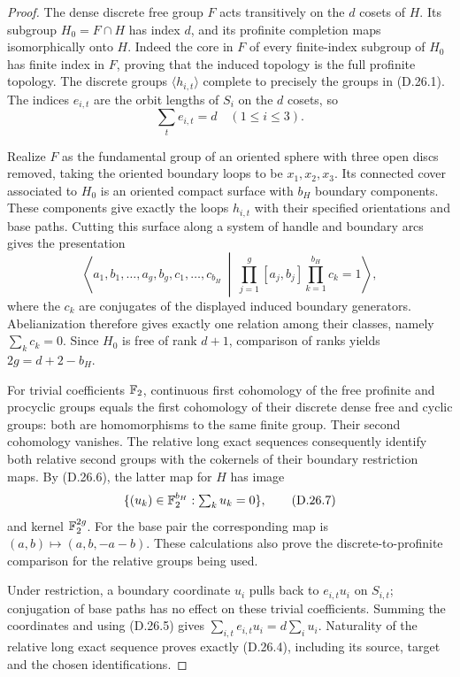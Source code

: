 \begin{proof}
The dense discrete free group $F$ acts transitively on the
$d$ cosets of $H$.  Its subgroup $H_0=F\cap H$ has index $d$,
and its profinite completion maps isomorphically onto $H$.
Indeed the core in $F$ of every finite-index subgroup of $H_0$
has finite index in $F$, proving that the induced topology is the
full profinite topology.  The discrete groups
$\langle h_{i,t}\rangle$ complete to precisely the groups in
\textup{(D.26.1)}.  The indices $e_{i,t}$ are the orbit lengths
of $S_i$ on the $d$ cosets, so
\[
                  \sum_t e_{i,t}=d\quad(1\leq i\leq3).
 \tag{D.26.5}
\]

Realize $F$ as the fundamental group of an oriented sphere
with three open discs removed, taking the oriented boundary
loops to be $x_1,x_2,x_3$.  Its connected cover associated to
$H_0$ is an oriented compact surface with $b_H$ boundary
components.  These components give exactly the loops
$h_{i,t}$ with their specified orientations and base paths.
Cutting this surface along a system of handle and boundary
arcs gives the presentation
\[
 \left\langle a_1,b_1,\ldots,a_g,b_g,
      c_1,\ldots,c_{b_H}\ \middle|\
      \prod_{j=1}^{g}[a_j,b_j]\prod_{k=1}^{b_H}c_k=1
 \right\rangle,
 \tag{D.26.6}
\]
where the $c_k$ are conjugates of the displayed induced boundary
generators.  Abelianization therefore gives exactly one relation
among their classes, namely $\sum_k c_k=0$.  Since
$H_0$ is free of rank $d+1$, comparison of ranks yields
$2g=d+2-b_H$.

For trivial coefficients $\mathbb F_2$, continuous first cohomology of
the free profinite and procyclic groups equals the first
cohomology of their discrete dense free and cyclic groups:
both are homomorphisms to the same finite group.
Their second cohomology vanishes.  The relative long exact
sequences consequently identify both relative second groups
with the cokernels of their boundary restriction maps.
By \textup{(D.26.6)}, the latter map for $H$ has image
\[
       \{(u_k)\in\mathbb F_2^{b_H}:\textstyle\sum_k u_k=0\},
 \tag{D.26.7}
\]
and kernel $\mathbb F_2^{2g}$.  For the base pair the corresponding
map is $(a,b)\mapsto(a,b,-a-b)$.
These calculations also prove the discrete-to-profinite
comparison for the relative groups being used.

Under restriction, a boundary coordinate $u_i$ pulls back to
$e_{i,t}u_i$ on $S_{i,t}$; conjugation of base paths has no
effect on these trivial coefficients.  Summing the coordinates
and using \textup{(D.26.5)} gives
$\sum_{i,t}e_{i,t}u_i=d\sum_i u_i$.  Naturality of the relative
long exact sequence proves exactly \textup{(D.26.4)}, including
its source, target and the chosen identifications.


\end{proof}
